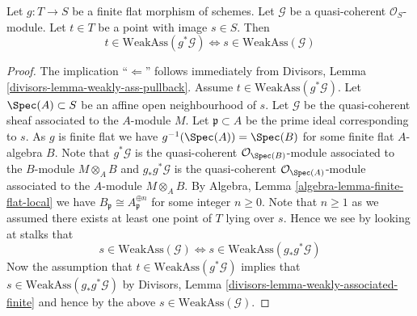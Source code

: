 \begin{lemma}
\label{lemma-finite-flat-weak-assassin-up-down}
Let $g : T \to S$ be a finite flat morphism of schemes.
Let $\mathcal{G}$ be a quasi-coherent $\mathcal{O}_S$-module.
Let $t \in T$ be a point with image $s \in S$. Then
$$
t \in \text{WeakAss}(g^*\mathcal{G})
\Leftrightarrow
s \in \text{WeakAss}(\mathcal{G})
$$
\end{lemma}

\begin{proof}
The implication ``$\Leftarrow$'' follows immediately from
Divisors, Lemma \ref{divisors-lemma-weakly-ass-pullback}.
Assume $t \in \text{WeakAss}(g^*\mathcal{G})$.
Let $\Spec(A) \subset S$ be an affine open neighbourhood of $s$.
Let $\mathcal{G}$ be the quasi-coherent sheaf associated to the $A$-module $M$.
Let $\mathfrak p \subset A$ be the prime ideal corresponding to $s$.
As $g$ is finite flat we have $g^{-1}(\Spec(A)) = \Spec(B)$
for some finite flat $A$-algebra $B$. Note that
$g^*\mathcal{G}$ is the quasi-coherent $\mathcal{O}_{\Spec(B)}$-module
associated to the $B$-module $M \otimes_A B$ and $g_*g^*\mathcal{G}$ is the
quasi-coherent $\mathcal{O}_{\Spec(A)}$-module associated to the
$A$-module $M \otimes_A B$. By
Algebra, Lemma \ref{algebra-lemma-finite-flat-local}
we have $B_{\mathfrak p} \cong A_{\mathfrak p}^{\oplus n}$
for some integer $n \geq 0$. Note that $n \geq 1$ as we assumed there
exists at least one point of $T$ lying over $s$. Hence we see by
looking at stalks that
$$
s \in \text{WeakAss}(\mathcal{G})
\Leftrightarrow
s \in \text{WeakAss}(g_*g^*\mathcal{G})
$$
Now the assumption that $t \in \text{WeakAss}(g^*\mathcal{G})$
implies that $s \in \text{WeakAss}(g_*g^*\mathcal{G})$ by
Divisors, Lemma \ref{divisors-lemma-weakly-associated-finite}
and hence by the above $s \in  \text{WeakAss}(\mathcal{G})$.
\end{proof}
